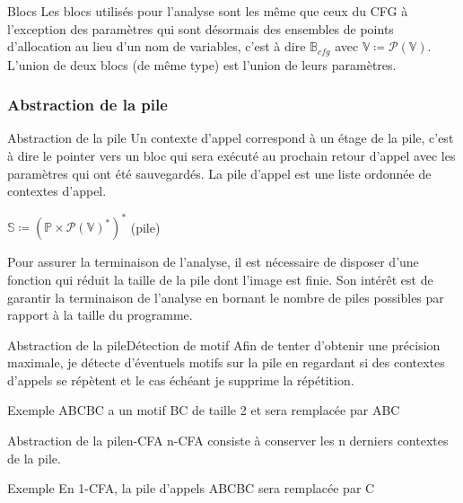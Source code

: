 \documentclass{beamer}
\begin{document}
\begin{frame}{Blocs}
    Les blocs utilisés pour l'analyse sont les même que ceux du CFG à l'exception des paramètres qui sont désormais des ensembles de points d'allocation au lieu d'un nom de variables, c'est à dire $\mathbb{B}_{cfg}$ avec $\mathbb{V} \coloneqq \mathcal{P}(\mathbb{V})$. L'union de deux blocs (de même type) est l'union de leurs paramètres.
\end{frame}

\subsubsection{Abstraction de la pile}

\begin{frame}{Abstraction de la pile}
    Un contexte d'appel correspond à un étage de la pile, c'est à dire le pointer vers un bloc qui sera exécuté au prochain retour d'appel avec les paramètres qui ont été sauvegardés. La pile d'appel est une liste ordonnée de contextes d'appel.

    $\mathbb{S} \coloneqq (\mathbb{P} \times \mathcal{P}(\mathbb{V})^{*})^{*}$ (pile)

    Pour assurer la terminaison de l'analyse, il est nécessaire de disposer d'une fonction qui réduit la taille de la pile dont l'image est finie. Son intérêt est de garantir la terminaison de l'analyse en bornant le nombre de piles possibles par rapport à la taille du programme.
\end{frame}

\begin{frame}{Abstraction de la pile}{Détection de motif}
    Afin de tenter d'obtenir une précision maximale, je détecte d'éventuels motifs sur la pile en regardant si des contextes d'appels se répètent et le cas échéant je supprime la répétition.%

    \begin{exampleblock}{Exemple}
        ABCBC a un motif BC de taille 2 et sera remplacée par ABC
    \end{exampleblock}
\end{frame}

\begin{frame}{Abstraction de la pile}{n-CFA}
    n-CFA consiste à conserver les n derniers contextes de la pile.%

    \begin{exampleblock}{Exemple}
        En 1-CFA, la pile d'appels ABCBC sera remplacée par C
    \end{exampleblock}
\end{frame}
\end{document}
